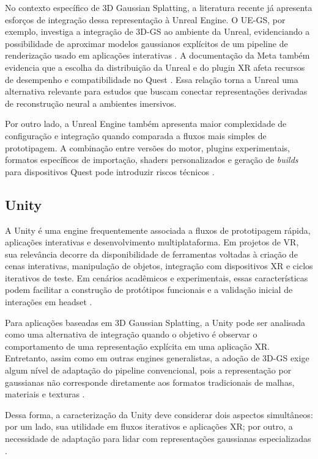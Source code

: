 No contexto específico de 3D Gaussian Splatting, a literatura recente já apresenta esforços de integração dessa representação à Unreal Engine. O UE-GS, por exemplo, investiga a integração de 3D-GS ao ambiente da Unreal, evidenciando a possibilidade de aproximar modelos gaussianos explícitos de um pipeline de renderização usado em aplicações interativas \cite{jin2024}. A documentação da Meta também evidencia que a escolha da distribuição da Unreal e do plugin XR afeta recursos de desempenho e compatibilidade no Quest \cite{metaUnrealCompatibility2026}. Essa relação torna a Unreal uma alternativa relevante para estudos que buscam conectar representações derivadas de reconstrução neural a ambientes imersivos.

Por outro lado, a Unreal Engine também apresenta maior complexidade de configuração e integração quando comparada a fluxos mais simples de prototipagem. A combinação entre versões do motor, plugins experimentais, formatos específicos de importação, shaders personalizados e geração de \textit{builds} para dispositivos Quest pode introduzir riscos técnicos \cite{jin2024,kerbl2023,fei2025survey3dgs,metaquest3s2024}.

\subsection{Unity}

A Unity é uma engine frequentemente associada a fluxos de prototipagem rápida, aplicações interativas e desenvolvimento multiplataforma. Em projetos de VR, sua relevância decorre da disponibilidade de ferramentas voltadas à criação de cenas interativas, manipulação de objetos, integração com dispositivos XR e ciclos iterativos de teste. Em cenários acadêmicos e experimentais, essas características podem facilitar a construção de protótipos funcionais e a validação inicial de interações em headset \cite{xu2023,tu2025,metaquest3s2024}.

Para aplicações baseadas em 3D Gaussian Splatting, a Unity pode ser analisada como uma alternativa de integração quando o objetivo é observar o comportamento de uma representação explícita em uma aplicação XR. Entretanto, assim como em outras engines generalistas, a adoção de 3D-GS exige algum nível de adaptação do pipeline convencional, pois a representação por gaussianas não corresponde diretamente aos formatos tradicionais de malhas, materiais e texturas \cite{kerbl2023,fei2025survey3dgs,chen2024survey3dgs}.

Dessa forma, a caracterização da Unity deve considerar dois aspectos simultâneos: por um lado, sua utilidade em fluxos iterativos e aplicações XR; por outro, a necessidade de adaptação para lidar com representações gaussianas especializadas \cite{xu2023,tu2025,metaquest3s2024}.

